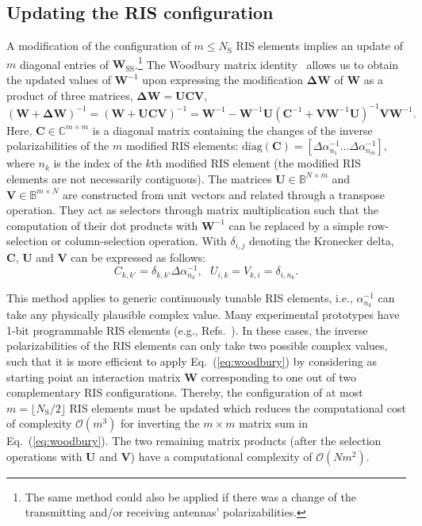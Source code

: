 \documentclass[journal,12pt,onecolumn,draftclsnofoot]{IEEEtran}
\begin{document}
\subsection{Updating the RIS configuration}\label{subsec_RISconfiguration}

A modification of the configuration of $m \leq N_{\mathrm{S}}$ RIS elements implies an update of $m$ diagonal entries of $\mathbf{W}_{\mathrm{SS}}$.\footnote{The same method could also be applied if there was a change of the transmitting and/or receiving antennas' polarizabilities.} The Woodbury matrix identity~\cite{hager1989updating} allows us to obtain the updated values of $\mathbf{W}^{-1}$ upon expressing the modification $\mathbf{\Delta W}$ of $\mathbf{W}$ as a product of three matrices, $\mathbf{\Delta W}=\mathbf{UCV}$,
\begin{equation}
    \mathbf{\left(W+\Delta W\right)}^{-1}=\mathbf{\left(W+UCV\right)}^{-1} =\mathbf{W}^{-1}-\mathbf{W}^{-1}\mathbf{U}\left(\mathbf{C}^{-1}+\mathbf{VW}^{-1}\mathbf{U}\right)^{-1}\mathbf{VW}^{-1}.
\label{eq:woodbury}
\end{equation}
Here, $\mathbf{C} \in \mathbb{C}^{m\times m}$ is a diagonal matrix containing the changes of the inverse polarizabilities of the $m$ modified RIS elements: $\mathrm{diag}(\mathbf{C}) = [ \Delta\alpha_{n_1}^{-1} \dots \Delta\alpha_{n_m}^{-1} ]$, where $n_k$ is the index of the $k$th modified RIS element (the modified RIS elements are not necessarily contiguous). The matrices $\mathbf{U} \in \mathbb{B}^{N\times m}$ and $\mathbf{V} \in \mathbb{B}^{m\times N}$ are constructed from unit vectors and related through a transpose operation. They act as selectors through matrix multiplication such that the computation of their dot products with $\mathbf{W}^{-1}$ can be replaced by a simple row-selection or column-selection operation. 
With $\delta_{i,j}$ denoting the Kronecker delta, $\mathbf{C}$, $\mathbf{U}$ and $\mathbf{V}$ can be expressed as follows:
\begin{equation}
C_{k,k'}=\delta_{k,k'}\Delta\alpha_{n_k}^{-1}, \ \ \ 
U_{i,k} = V_{k,i} = \delta_{i,n_k}.
\end{equation}

This method applies to generic continuously tunable RIS elements, i.e., $\alpha_{n_k}^{-1}$ can take any physically plausible complex value. Many experimental prototypes have 1-bit programmable RIS elements (e.g., Refs.~\cite{rabault2023tacit,GeorgeMag}). In these cases, the inverse polarizabilities of the RIS elements can only take two possible complex values, such that it is more efficient to apply Eq.~(\ref{eq:woodbury}) by considering as starting point an interaction matrix $\mathbf{W}$ corresponding to one out of two complementary RIS configurations. Thereby, the configuration of at most $m=\lfloor N_\mathrm{S}/2 \rfloor$ RIS elements must be updated which reduces the computational cost of complexity $\mathcal{O}\left(m^3\right)$ for inverting the $m \times m$ matrix sum in Eq.~(\ref{eq:woodbury}). The two remaining matrix products (after the selection operations with $\mathbf{U}$ and $\mathbf{V}$) have a computational complexity of $\mathcal{O}\left(Nm^2\right)$.
\end{document}
